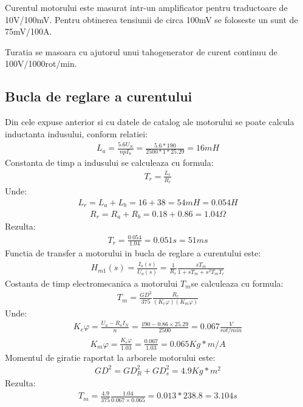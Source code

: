 \documentclass[11pt]{article}
\begin{document}
Curentul motorului este masurat intr-un amplificator pentru traductoare de 10V/100mV. Pentru obtinerea tensiunii de circa 100mV se foloseste un sunt de 75mV/100A.

Turatia se masoara cu ajutorul unui tahogenerator de curent continuu de 100V/1000rot/min.

\subsection{Bucla de reglare a curentului}
Din cele expuse anterior si cu datele de catalog ale motorului se poate calcula inductanta indusului, conform relatiei:
\begin{align*}
L_a=\frac{5.6U_N}{npI_n}=\frac{5.6\ast190}{2500\ast 1\ast 25.29}=16mH
\end{align*}
Constanta de timp a indusului se calculeaza cu formula:
\begin{align*}
T_r=\frac{L_r}{R_r}
\end{align*}
Unde:
\begin{align*}
L_r=L_a+L_b=16+38=54mH=0.054H
\end{align*}
\begin{align*}
R_r=R_a+R_b=0.18+0.86=1.04\Omega
\end{align*}
Rezulta:
\begin{align*}
T_r=\frac{0.054}{1.04}=0.051s=51 ms
\end{align*}
Functia de transfer a motorului in bucla de reglare a curentului este:
\begin{align*}
H_{m1}(s)=\frac{I_a(s)}{U_a(s)}=\frac{1}{R_r}\frac{s T_m}{1+sT_m+s^2T_mT_r}
\end{align*}
Costanta de timp electromecanica a motorului $T_m $se calculeaza cu formula:
\begin{align*}
T_m=\frac{GD^2}{375}\frac{R_r}{(K_e\varphi)(K_m\varphi)}
\end{align*}
Unde:
\begin{align*}
K_e\varphi=\frac{U_a-R_aI_N}{n}=\frac{190-0.86\times 25.29}{2500}=0.067 \frac{V}{rot/min}
\end{align*}
\begin{align*}
K_m\varphi=\frac{K_e\varphi}{1.03}=\frac{0.067}{1.03}=0.065 Kg\ast m/A
\end{align*}
Momentul de giratie raportat la arborele motorului este:
\begin{align*}
GD^2=GD_R^2+GD_s^2=4.9 Kg\ast m^2
\end{align*}
Rezulta:
\begin{align*}
T_m=\frac{4.9}{375}\frac{1.04}{0.067\times 0.065}=0.013\ast 238.8=3.104s
\end{align*}
\end{document}
